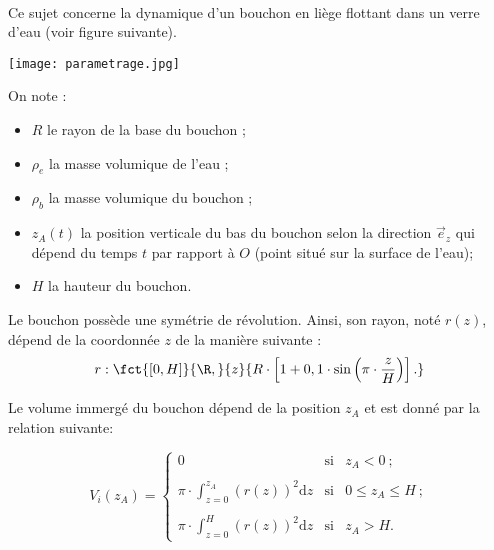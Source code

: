 \exer{[EQD-003]}
\setcounter{numques}{0}~\\


Ce sujet concerne la dynamique d'un bouchon en liège flottant dans un verre d'eau (voir figure suivante).%

\bigskip{}

\begin{minipage}{0.45\textwidth}
\begin{center}
    \texttt{[image: parametrage.jpg]}
\end{center}
\end{minipage}
\begin{minipage}{0.45\textwidth}
On note : 
\begin{itemize}
\item $R$ le rayon de la base du bouchon ;
\item $\rho_e$ la masse volumique de l'eau ;
\item $\rho_b$ la masse volumique du bouchon ;
\item $z_A(t)$ la position verticale du bas du bouchon selon la direction $\overrightarrow{e}_z$ qui dépend du temps $t$ par rapport à $O$ (point situé sur la surface de l'eau);
\item $H$ la hauteur du bouchon.
\end{itemize}
\end{minipage}

\bigskip{}

Le bouchon possède une symétrie de révolution. Ainsi, son rayon, noté $r(z)$, dépend de la coordonnée $z$ de la manière suivante : 
\begin{equation*}
    r:\fct{[0,H]}{\R,}{z}{R\cdot \left[1+0,1\cdot \sin\left(\pi\cdot\dfrac{z}{H}\right)\right].}
\end{equation*}


Le volume immergé du bouchon dépend de la position $z_A$ et est donné par la relation suivante: 

\begin{equation*}
V_i(z_A)=
\left\{
\begin{array}{rcl}
0&\text{si}& z_A < 0~;\\
\\
\pi\cdot \displaystyle\int_{z=0}^{z_A}\left(r(z)\right)^2\mathrm{d}z&\text{si}& 0\leq z_A \leq H~;\\
\\
\pi\cdot \displaystyle\int_{z=0}^{H}\left(r(z)\right)^2\mathrm{d}z&\text{si}& z_A > H.
\end{array}
\right.
\end{equation*}

